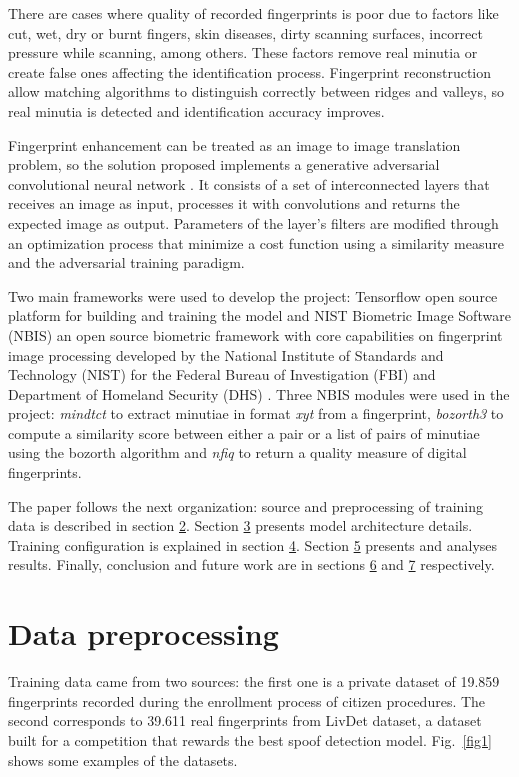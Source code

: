 \documentclass[a4paper,fleqn]{cas-dc}
\begin{document}
There are cases where quality of recorded fingerprints is poor due to factors like cut, wet, dry or burnt fingers, skin diseases, dirty scanning surfaces, incorrect pressure while scanning, among others. These factors remove real minutia or create false ones affecting the identification process. Fingerprint reconstruction allow matching algorithms to distinguish correctly between ridges and valleys, so real minutia is detected and identification accuracy improves.

Fingerprint enhancement can be treated as an image to image translation problem, so the solution proposed implements a generative adversarial convolutional neural network \cite{ITITAN}. It consists of a set of interconnected layers that receives an image as input, processes it with convolutions and returns the expected image as output. Parameters of the layer's filters are modified through an optimization process that minimize a cost function using a similarity measure and the adversarial training paradigm. 

Two main frameworks were used to develop the project: Tensorflow open source platform for building and training the model and NIST Biometric Image Software (NBIS) an open source biometric framework with core capabilities on fingerprint image processing developed by the National Institute of Standards and Technology (NIST) for the Federal Bureau of Investigation (FBI) and Department of Homeland Security (DHS) \cite{NBISWP}. Three NBIS modules were used in the project: \textit{mindtct} to extract minutiae in format \textit{xyt} from a fingerprint, \textit{bozorth3} to compute a similarity score between either a pair or a list of pairs of minutiae using the bozorth algorithm and \textit{nfiq} to return a quality measure of digital fingerprints.

The paper follows the next organization: source and preprocessing of training data is described in section \hyperref[sec:DP]{2}. Section \hyperref[sec:MA]{3} presents model architecture details. Training configuration is explained in section \hyperref[sec:MT]{4}. Section \hyperref[sec:R]{5} presents and analyses results. Finally, conclusion and future work are in sections \hyperref[sec:FW]{6} and \hyperref[sec:FW]{7} respectively.
     
\section{Data preprocessing}
\label{sec:DP}

Training data came from two sources: the first one is a private dataset of 19.859 fingerprints recorded during the enrollment process of citizen procedures. The second corresponds to 39.611 real fingerprints from LivDet dataset, a dataset built for a competition that rewards the best spoof detection model. Fig.~\ref{fig1} shows some examples of the datasets.
\end{document}
